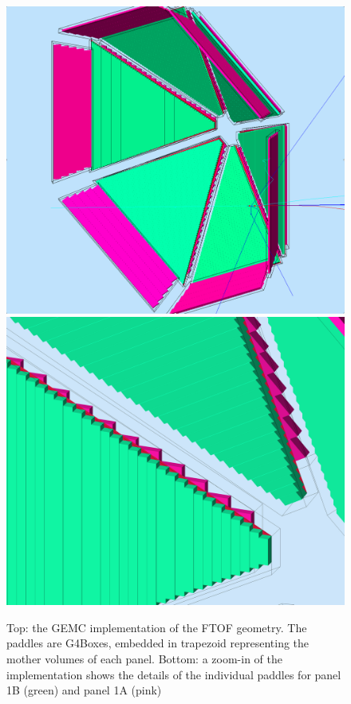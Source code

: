 \begin{figure}
	\centering
	\includegraphics[width=0.99\columnwidth,keepaspectratio]{img/ftofGeometry.png}
	\includegraphics[width=0.99\columnwidth,keepaspectratio]{img/ftofDetail.png}
	\caption{Top: the GEMC implementation of the FTOF geometry. The paddles are G4Boxes, embedded in trapezoid representing the mother volumes of each panel.
            Bottom: a zoom-in of the implementation shows the details of the individual paddles for panel 1B (green) and panel 1A (pink) }
	\label{fig:ftofGeometry}
\end{figure}

